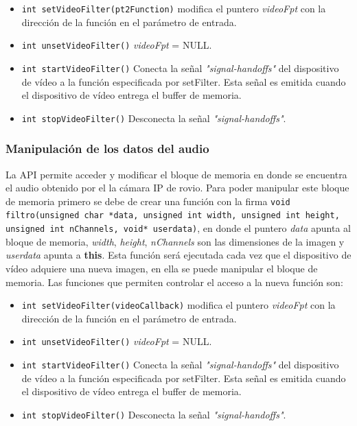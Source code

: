 \documentclass[a4paper,10pt]{article}
\begin{document}
    \begin{itemize}
      \item \texttt{int setVideoFilter(pt2Function)} modifica el puntero \textit{videoFpt} con la dirección de la función en el parámetro de entrada.
      \item \texttt{int unsetVideoFilter()} \textit{videoFpt} = NULL.
      \item \texttt{int startVideoFilter()} Conecta la señal \textit{"signal-handoffs"} del dispositivo de vídeo a la función especificada por setFilter. Esta señal es emitida cuando el dispositivo de vídeo entrega el buffer de memoria.
      \item \texttt{int stopVideoFilter()} Desconecta la señal \textit{"signal-handoffs"}.
    \end{itemize}
  \subsubsection{Manipulación de los datos del audio}
  La API permite acceder y modificar el bloque de memoria en donde se encuentra el audio obtenido por el la cámara IP de rovio. Para poder manipular este bloque de memoria primero se debe de crear una función con la firma \texttt{void filtro(unsigned char *data, unsigned int width, unsigned int height, unsigned int nChannels, void* userdata)}, en donde el puntero \textit{data} apunta al bloque de memoria, \textit{width}, \textit{height}, \textit{nChannels} son las dimensiones de la imagen y \textit{userdata} apunta a \textbf{this}. Esta función será ejecutada cada vez que el dispositivo de vídeo adquiere una nueva imagen, en ella se puede manipular el bloque de memoria. Las funciones que permiten controlar el acceso a la nueva función son:
 
    \begin{itemize}
      \item \texttt{int setVideoFilter(videoCallback)} modifica el puntero \textit{videoFpt} con la dirección de la función en el parámetro de entrada.
      \item \texttt{int unsetVideoFilter()} \textit{videoFpt} = NULL.
      \item \texttt{int startVideoFilter()} Conecta la señal \textit{"signal-handoffs"} del dispositivo de vídeo a la función especificada por setFilter. Esta señal es emitida cuando el dispositivo de vídeo entrega el buffer de memoria.
      \item \texttt{int stopVideoFilter()} Desconecta la señal \textit{"signal-handoffs"}.
    \end{itemize}
\end{document}
